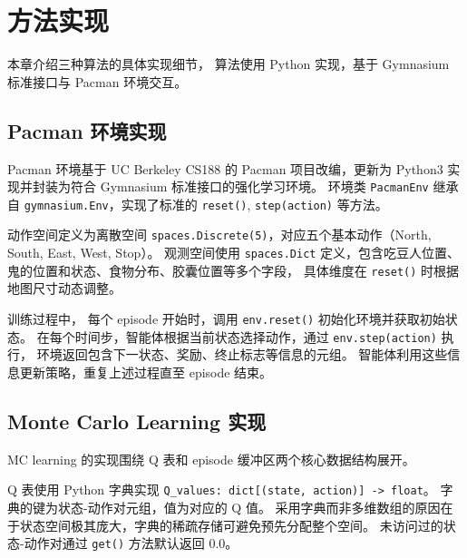 \section{方法实现}

本章介绍三种算法的具体实现细节，
算法使用 Python 实现，基于 Gymnasium 标准接口与 Pacman 环境交互。

\subsection{Pacman 环境实现}

Pacman 环境基于 UC Berkeley CS188 的 Pacman 项目改编，更新为 Python3 实现并封装为符合 Gymnasium 标准接口的强化学习环境。
环境类 \texttt{PacmanEnv} 继承自 \texttt{gymnasium.Env}，实现了标准的 \texttt{reset()}, \texttt{step(action)} 等方法。

动作空间定义为离散空间 \texttt{spaces.Discrete(5)}，对应五个基本动作（North, South, East, West, Stop）。
观测空间使用 \texttt{spaces.Dict} 定义，包含吃豆人位置、鬼的位置和状态、食物分布、胶囊位置等多个字段，
具体维度在 \texttt{reset()} 时根据地图尺寸动态调整。

训练过程中，
每个 episode 开始时，调用 \texttt{env.reset()} 初始化环境并获取初始状态。
在每个时间步，智能体根据当前状态选择动作，通过 \texttt{env.step(action)} 执行，
环境返回包含下一状态、奖励、终止标志等信息的元组。
智能体利用这些信息更新策略，重复上述过程直至 episode 结束。



\subsection{Monte Carlo Learning 实现}

MC learning 的实现围绕 Q 表和 episode 缓冲区两个核心数据结构展开。


Q 表使用 Python 字典实现 \texttt{Q\_values: dict[(state, action)] -> float}。
字典的键为状态-动作对元组，值为对应的 Q 值。
采用字典而非多维数组的原因在于状态空间极其庞大，字典的稀疏存储可避免预先分配整个空间。
未访问过的状态-动作对通过 \texttt{get()} 方法默认返回 0.0。

